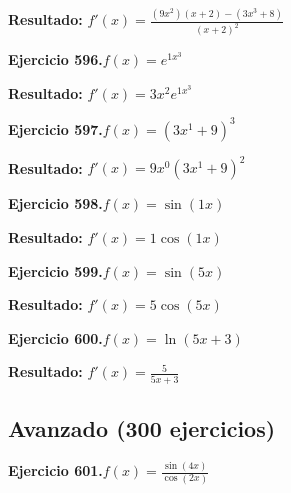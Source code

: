 \documentclass[10pt,a4paper]{article}
\begin{document}
\begin{solbox}
\textbf{Resultado:} \(\displaystyle f'(x) = \frac{(9x^{2})(x+2) - (3x^{3} +8)}{(x+2)^2}\)
\end{solbox}

\begin{ejbox}
\textbf{Ejercicio 596.}\quad $f(x) = e^{1x^{3}}$
\end{ejbox}

\begin{solbox}
\textbf{Resultado:} \(\displaystyle f'(x) = 3x^{2}e^{1x^{3}}\)
\end{solbox}

\begin{ejbox}
\textbf{Ejercicio 597.}\quad $f(x) = (3x^{1} +9)^{3}$
\end{ejbox}

\begin{solbox}
\textbf{Resultado:} \(\displaystyle f'(x) = 9x^{0}(3x^{1} +9)^{2}\)
\end{solbox}

\newpage
\begin{ejbox}
\textbf{Ejercicio 598.}\quad $f(x) = \sin(1x)$
\end{ejbox}

\begin{solbox}
\textbf{Resultado:} \(\displaystyle f'(x) = 1\cos(1x)\)
\end{solbox}

\begin{ejbox}
\textbf{Ejercicio 599.}\quad $f(x) = \sin(5x)$
\end{ejbox}

\begin{solbox}
\textbf{Resultado:} \(\displaystyle f'(x) = 5\cos(5x)\)
\end{solbox}

\begin{ejbox}
\textbf{Ejercicio 600.}\quad $f(x) = \ln(5x + 3)$
\end{ejbox}

\begin{solbox}
\textbf{Resultado:} \(\displaystyle f'(x) = \frac{5}{5x + 3}\)
\end{solbox}

\newpage
\newpage
\subsection{Avanzado (300 ejercicios)}

\begin{ejbox}
\textbf{Ejercicio 601.}\quad $f(x) = \frac{\sin(4x)}{\cos(2x)}$
\end{ejbox}
\end{document}
